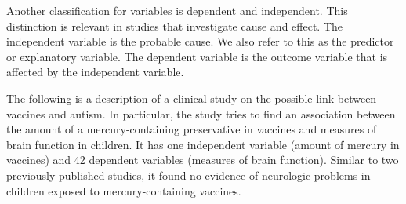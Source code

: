 \documentclass[11pt]{book}\usepackage[]{graphicx}\usepackage[]{color}
\begin{document}
Another classification for variables is dependent and independent. This distinction is relevant in studies that investigate cause and effect.  The independent variable is the probable cause.  We also refer to this as the predictor or explanatory variable.  The dependent variable is the outcome variable that is affected by the independent variable.

\vspace{3mm}


\vspace{3mm}

The following is a description of a clinical study on the possible link between vaccines and autism.   In particular, the study tries to find an association between the amount of a mercury-containing preservative in vaccines and measures of brain function in children.   It has one independent variable (amount of mercury in vaccines) and 42 dependent variables (measures of brain function).  Similar to two previously published studies, it found no evidence of neurologic problems in children exposed to mercury-containing vaccines. \citep{thompson2007}
\end{document}
